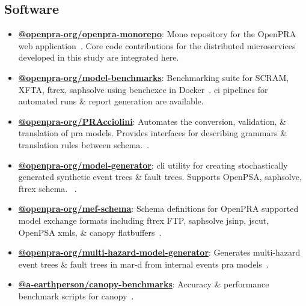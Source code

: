 \subsection{Software}
\begin{itemize}
    \item {\textbf{\href{https://github.com/openpra-org/openpra-monorepo}{@openpra-org/openpra-monorepo}}: Mono repository for the OpenPRA web application~\cite{openpra_initiative_openpra_2024}}. Core code contributions for the distributed microservices developed in this study are integrated here.
    
    \item {\textbf{\href{https://github.com/openpra-org/model-benchmarks}{@openpra-org/model-benchmarks}}: Benchmarking suite for SCRAM, XFTA, \acrshort{ftrex}, \acrshort{saphsolve} using benchexec in Docker~\cite{earthperson_pra_2025}}. \acrlong{ci} pipelines for automated runs \& report generation are available.

    \item {\textbf{\href{https://github.com/openpra-org/PRAcciolini}{@openpra-org/PRAcciolini}}: Automates the conversion, validation, \& translation of \acrshort{pra} models. Provides interfaces for describing grammars \& translation rules between schema.~\cite{earthperson_pracciolini_2024}}.
    
    \item {\textbf{\href{https://github.com/openpra-org/model-generator}{@openpra-org/model-generator}}: \acrshort{cli} utility for creating stochastically generated synthetic event trees \& fault trees. Supports OpenPSA, \acrshort{saphsolve}, \acrshort{ftrex} schema. ~\cite{earthperson_pra_2022}}.
    
    \item {\textbf{\href{https://github.com/openpra-org/mef-schema}{@openpra-org/mef-schema}}: Schema definitions for OpenPRA supported model exchange formats including \acrshort{ftrex} FTP, \acrshort{saphsolve} \acrshort{jsinp}, \acrshort{jscut}, OpenPSA \acrshort{xml}s, \& canopy flatbuffers~\cite{earthperson_pra_2024}}.
    
    \item {\textbf{\href{https://github.com/openpra-org/multi-hazard-model-generator}{@openpra-org/multi-hazard-model-generator}}: Generates multi-hazard event trees \& fault trees in \acrshort{mar-d} from internal events \acrshort{pra} models~\cite{batikh_multi_2023}}.
    
    \item {\textbf{\href{https://github.com/a-earthperson/canopy-benchmarks}{@a-earthperson/canopy-benchmarks}}: Accuracy \& performance benchmark scripts for canopy~\cite{earthperson_canopy_2025}}.
\end{itemize}